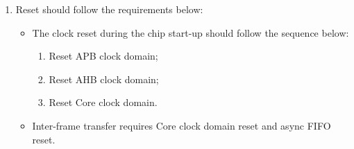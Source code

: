 \documentclass[main\_\_EN.tex]{subfiles}
\begin{document}
\begin{enumerate}
    Here are the specific operation steps for the RX unit:
    \begin{itemize}
        \item Clear \hyperref[fielddesc:PCRPARLCLKRXEN]{PCR\_PARL\_CLK\_RX\_EN} to turn off RX Core clock domain;
        \item Write 1 to \hyperref[fielddesc:PARLIORXSTART]{PARL\_IO\_RX\_START};
        \item Set \hyperref[fielddesc:PCRPARLCLKRXEN]{PCR\_PARL\_CLK\_RX\_EN} to turn on RX Core clock domain;
        \item Operate the external device to start sending data;
        \item Clear \hyperref[fielddesc:PCRPARLCLKRXEN]{PCR\_PARL\_CLK\_RX\_EN} to turn off RX Core clock domain;
        \item Write 0 to \hyperref[fielddesc:PARLIORXSTART]{PARL\_IO\_RX\_START}.
    \end{itemize}
    Here are the specific operation steps for the TX unit:
    \begin{itemize}
        \item Clear \hyperref[fielddesc:PCRPARLCLKTXEN]{PCR\_PARL\_CLK\_TX\_EN} to turn off TX Core clock domain;
        \item Write 1 to \hyperref[fielddesc:PARLIOTXSTART]{PARL\_IO\_TX\_START};
        \item Set \hyperref[fielddesc:PCRPARLCLKTXEN]{PCR\_PARL\_CLK\_TX\_EN} to turn on TX Core clock domain;
        \item Operate the external device to start receiving data;
        \item Clear \hyperref[fielddesc:PCRPARLCLKTXEN]{PCR\_PARL\_CLK\_TX\_EN} to turn off TX Core clock domain;
        \item Write 0 to \hyperref[fielddesc:PARLIOTXSTART]{PARL\_IO\_TX\_START}.
    \end{itemize}
    
    \item Reset should follow the requirements below:
    \begin{itemize}
        \item The clock reset during the chip start-up should follow the sequence below:
        \begin{enumerate}
            \item Reset APB clock domain;
            \item Reset AHB clock domain;
            \item Reset Core clock domain.
        \end{enumerate}
        \item Inter-frame transfer requires Core clock domain reset and async FIFO reset.
    \end{itemize}
\end{enumerate}
\end{document}
